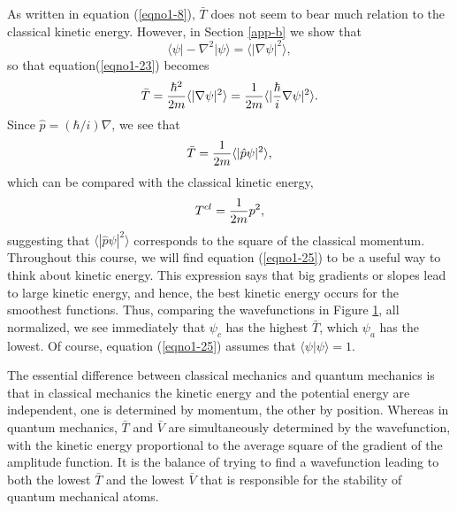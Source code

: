 As written in equation (\ref{eqno1-8}), ${\bar T}$ does not seem to
bear much relation to the classical kinetic energy.  However, in
Section \ref{app-b} we show that
\begin{equation}
\langle \psi \vert - \nabla^2 \vert \psi \rangle = \langle \vert \nabla 
\psi \vert^2 \rangle,
\end{equation}
so that equation(\ref{eqno1-23}) becomes
\begin{equation}
{\bar T} = {\hbar^2 \over 2m} \langle \vert \nabla \psi \vert^2\rangle 
= {1 \over 2m} \langle \vert {\hbar \over i} \nabla \psi \vert^2 \rangle .
\label{eqno1-25}
\end{equation}
Since ${\hat p} = ( \hbar / i ) \nabla$, we see that
\begin{equation}
{\bar T} = {1 \over 2m} \langle \vert {\hat p} \psi \vert^2 \rangle ,
\end{equation}
which can be compared with the classical kinetic energy,
\begin{equation}
T^{cl} = {1 \over 2m} p^2 ,
\end{equation}
suggesting that $\langle | {\hat p} \psi |^2\rangle$ corresponds to the square
of the classical momentum. Throughout this course, we will find
equation (\ref{eqno1-25}) to be a useful way to think about kinetic
energy. This expression says that big gradients or slopes lead to
large kinetic energy, and hence, the best kinetic energy occurs for
the smoothest functions. Thus, comparing the wavefunctions in Figure
\ref{fig1-4}, all normalized, we see immediately that $\psi_c$ has
the highest ${\bar T}$, which $\psi_a$ has the lowest. Of course,
equation (\ref{eqno1-25}) assumes that $\langle \psi | \psi \rangle = 1$.

\begin{figure}
\caption{}
\label{fig1-4}
\end{figure}

The essential difference between classical mechanics and quantum mechanics 
is that in classical mechanics the kinetic energy and the potential energy 
are independent, one is determined by momentum, the other by position.  Whereas 
in quantum mechanics, ${\bar T}$ and ${\bar V}$
are simultaneously determined by the wavefunction, with the kinetic 
energy proportional to the average square of the gradient of the amplitude 
function. It is the balance of trying to find
a wavefunction leading to both the lowest ${\bar T}$ and the lowest ${\bar 
V}$ that is responsible for the stability of quantum mechanical atoms.


